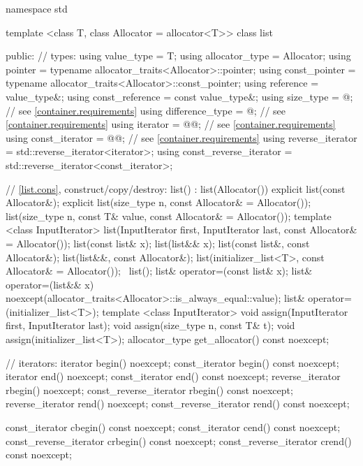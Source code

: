 \begin{codeblock}
namespace std {
  template <class T, class Allocator = allocator<T>>
  class list {
  public:
    // types:
    using value_type             = T;
    using allocator_type         = Allocator;
    using pointer                = typename allocator_traits<Allocator>::pointer;
    using const_pointer          = typename allocator_traits<Allocator>::const_pointer;
    using reference              = value_type&;
    using const_reference        = const value_type&;
    using size_type              = @\impdef@; // see \ref{container.requirements}
    using difference_type        = @\impdef@; // see \ref{container.requirements}
    using iterator               = @@; // see \ref{container.requirements}
    using const_iterator         = @@; // see \ref{container.requirements}
    using reverse_iterator       = std::reverse_iterator<iterator>;
    using const_reverse_iterator = std::reverse_iterator<const_iterator>;

    // \ref{list.cons}, construct/copy/destroy:
    list() : list(Allocator()) { }
    explicit list(const Allocator&);
    explicit list(size_type n, const Allocator& = Allocator());
    list(size_type n, const T& value, const Allocator& = Allocator());
    template <class InputIterator>
      list(InputIterator first, InputIterator last, const Allocator& = Allocator());
    list(const list& x);
    list(list&& x);
    list(const list&, const Allocator&);
    list(list&&, const Allocator&);
    list(initializer_list<T>, const Allocator& = Allocator());
    ~list();
    list& operator=(const list& x);
    list& operator=(list&& x)
      noexcept(allocator_traits<Allocator>::is_always_equal::value);
    list& operator=(initializer_list<T>);
    template <class InputIterator>
      void assign(InputIterator first, InputIterator last);
    void assign(size_type n, const T& t);
    void assign(initializer_list<T>);
    allocator_type get_allocator() const noexcept;

    // iterators:
    iterator               begin() noexcept;
    const_iterator         begin() const noexcept;
    iterator               end() noexcept;
    const_iterator         end() const noexcept;
    reverse_iterator       rbegin() noexcept;
    const_reverse_iterator rbegin() const noexcept;
    reverse_iterator       rend() noexcept;
    const_reverse_iterator rend() const noexcept;

    const_iterator         cbegin() const noexcept;
    const_iterator         cend() const noexcept;
    const_reverse_iterator crbegin() const noexcept;
    const_reverse_iterator crend() const noexcept;

}}
\end{codeblock}
